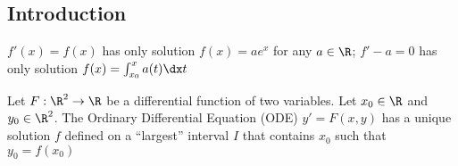 \subsection{Introduction}
\shortex $f'(x) = f(x)$ has only solution $f(x) = ae^x$ for any $a \in \R$;
$f' - a = 0$ has only solution $f(x) = \int_{x_0}^{x} a(t) \dx t$

\setcounter{all}{6}
\shorttheorem Let $F: \R^2 \rightarrow \R$ be a differential function of two variables. Let $x_0 \in \R$ and $y_0 \in \R^2$.
The Ordinary Differential Equation (ODE) $y' = F(x, y)$ has a unique solution $f$ defined on a ``largest'' interval $I$ that contains $x_0$ such that $y_0 = f(x_0)$
